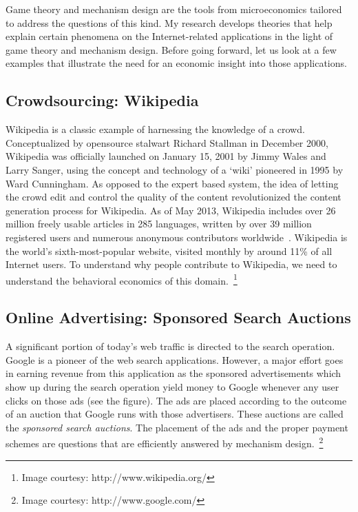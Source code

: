 \documentclass[10pt,psfig,letter]{article}
\begin{document}
Game theory and mechanism design are the tools from microeconomics tailored to address the questions of this kind. My research develops theories that help explain certain phenomena on the Internet-related applications in the light of game theory and mechanism design. Before going forward, let us look at a few examples that illustrate the need for an economic insight into those applications.

\subsection{Crowdsourcing: Wikipedia}

\begin{figure}
\centering
\vspace{-0.15in}
\vspace{-0.15in}
\end{figure}
Wikipedia is a classic example of harnessing the knowledge of a crowd. Conceptualized by opensource stalwart Richard Stallman in December 2000, Wikipedia was officially launched on January 15, 2001 by Jimmy Wales and Larry Sanger, using the concept and technology of a `wiki' pioneered in 1995 by Ward Cunningham. As opposed to the expert based system, the idea of letting the crowd edit and control the quality of the content revolutionized the content generation process for Wikipedia. 
As of May 2013, Wikipedia includes over 26 million freely usable articles in 285 languages, written by over 39 million registered users and numerous anonymous contributors worldwide~\cite{Wikimedia.org2013}. Wikipedia is the world's sixth-most-popular website, visited monthly by around 11\% of all Internet users. To understand why people contribute to Wikipedia, we need to understand the behavioral economics of this domain.~\footnote{Image courtesy: http://www.wikipedia.org/}
% 

\subsection{Online Advertising: Sponsored Search Auctions}


A significant portion of today's web traffic is directed to the search operation. Google is a pioneer of the web search applications. However, a major effort goes in earning revenue from this application as the sponsored advertisements which show up during the search operation yield money to Google whenever any user clicks on those ads (see the figure). The ads are placed according to the outcome of an auction that Google runs with those advertisers. These auctions are called the {\em sponsored search auctions}. The placement of the ads and the proper payment schemes are questions that are efficiently answered by mechanism design.~\footnote{Image courtesy: http://www.google.com/}
\end{document}
